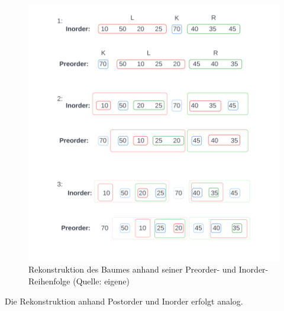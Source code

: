 \begin{figure}
    \begin{center}
        \includegraphics[scale=0.5]{chapters/5. Binäre Bäume/img/reconstruction}
        \caption{Rekonstruktion des Baumes anhand seiner Preorder- und Inorder-Reihenfolge (Quelle: eigene)}
        \label{fig:reconstruction}
    \end{center}
\end{figure}

Die Rekonstruktion anhand Postorder und Inorder erfolgt analog.





